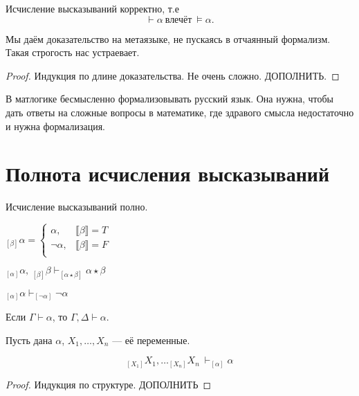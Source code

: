 \begin{theorem}
    Исчисление высказываний корректно, т.е
    \[ \vdash \alpha\ \text{влечёт}\ \vDash \alpha. \]
\end{theorem}
Мы даём доказательство на метаязыке, не пускаясь в отчаянный формализм.
Такая строгость нас устраевает.
\begin{proof}
    Индукция по длине доказательства. 
    Не очень сложно. 
    ДОПОЛНИТЬ.
\end{proof}

В матлогике бесмысленно формализовывать русский язык.
Она нужна, чтобы дать ответы на сложные вопросы в математике, где здравого смысла недостаточно и нужна формализация.

\section{Полнота исчисления высказываний}
\begin{theorem}
    Исчисление высказываний полно.
\end{theorem}

\begin{definition}
    $_{[\beta]}\alpha = 
    \begin{cases}
        \alpha, & \llbracket \beta \rrbracket = T\\
        \neg \alpha,&  \llbracket \beta \rrbracket = F\\
    \end{cases}$
\end{definition}

\begin{lemma}
    $_{[\alpha]}\alpha,\ _{[\beta]}\beta \vdash _{[\alpha \star \beta]} \alpha \star \beta$ 

    $_{[\alpha]} \alpha \vdash _{[\neg \alpha]}\neg\alpha $
\end{lemma}

\begin{lemma}
Если $\Gamma \vdash \alpha$, то $\Gamma, \Delta \vdash \alpha$.
\end{lemma}

\begin{lemma} 
Пусть дана $\alpha$, $X_1,\ldots, X_n$ --- её переменные.   

\[ _{[X_1]}X_1,\ldots _{[X_n]}X_n\ \vdash _{[\alpha]}\alpha  \]
\end{lemma}
\begin{proof}
    Индукция по структуре. ДОПОЛНИТЬ
\end{proof}

